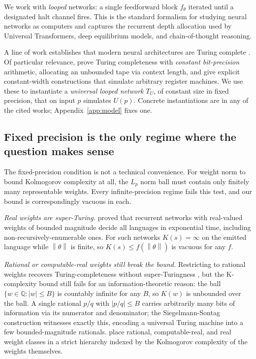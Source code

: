 \documentclass{article}
\theoremstyle{definition}
\newcommand{\Q}{\mathbb{Q}}
\newcommand{\norm}[1]{\left\lVert#1\right\rVert}
\begin{document}
We work with \emph{looped} networks: a single feedforward block $f_\theta$
iterated until a designated halt channel fires. This is the standard formalism
for studying neural networks as computers
\citep{dehghani2018universal,giannou2023looped} and captures the recurrent
depth allocation used by Universal Transformers, deep equilibrium models, and
chain-of-thought reasoning.

A line of work establishes that modern neural architectures are Turing complete
\citep{perez2019turing,perez2021attention,bhattamishra2020computational,Roberts2024decoder,qiu2025prompt}.
Of particular relevance, \citet{li2025constant,li2026efficient} prove Turing
completeness with \emph{constant bit-precision} arithmetic, allocating an
unbounded tape via context length, and \citet{giannou2023looped} give explicit
constant-width constructions that simulate arbitrary register machines. We use
these to instantiate a \emph{universal looped network} $T_U$, of constant size
in fixed precision, that on input $p$ simulates $U(p)$. Concrete instantiations
are in any of the cited works; Appendix~\ref{app:model} fixes one.

\subsection{Fixed precision is the only regime where the question makes sense}\label{sec:bg:precision}

The fixed-precision condition is not a technical convenience. For weight norm
to bound Kolmogorov complexity at all, the $L_p$ norm ball must contain only
finitely many representable weights. Every infinite-precision regime fails this
test, and our bound is correspondingly vacuous in each.

\emph{Real weights are super-Turing.}
\citet{siegelmann1995computational} proved that recurrent networks with
real-valued weights of bounded magnitude decide all languages in exponential
time, including non-recursively-enumerable ones. For such networks
$K(s) = \infty$ on the emitted language while $\norm{\theta}$ is finite, so
$K(s) \le f(\norm{\theta})$ is vacuous for any $f$.

\emph{Rational or computable-real weights still break the bound.} Restricting
to rational weights recovers Turing-completeness without super-Turingness
\citep{siegelmann1995computational}, but the K-complexity bound still fails
for an information-theoretic reason: the ball $\{w \in \Q : |w| \le B\}$ is
countably infinite for any $B$, so $K(w)$ is unbounded over the ball. A single
rational $p/q$ with $|p/q| \le B$ carries arbitrarily many bits of information
via its numerator and denominator; the Siegelmann-Sontag construction
witnesses exactly this, encoding a universal Turing machine into a few
bounded-magnitude rationals. \citet{balcazar1997computational} place rational,
computable-real, and real weight classes in a strict hierarchy indexed by the
Kolmogorov complexity of the weights themselves.
\end{document}

